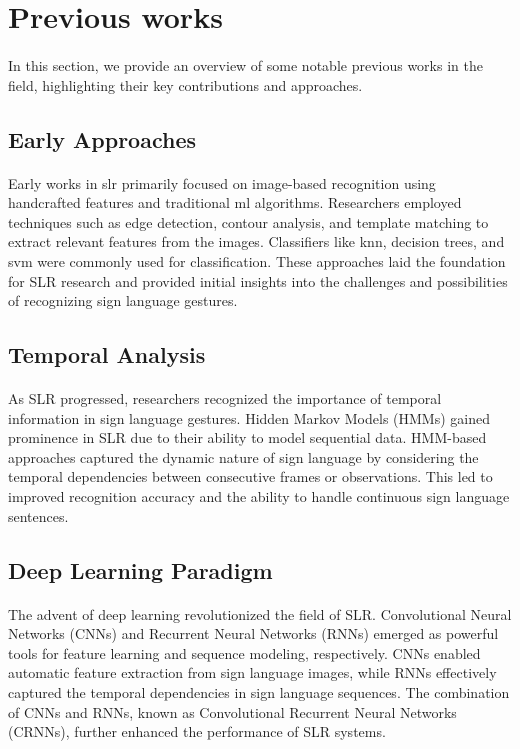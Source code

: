 \section{Previous works}
\paragraph{}
In this section, we provide an overview of some notable previous works in the field, highlighting their key contributions and approaches.

\subsection{Early Approaches}
\paragraph{}
Early works in \ac{slr} primarily focused on image-based recognition using handcrafted features and traditional \ac{ml} algorithms. Researchers employed techniques such as edge detection, contour analysis, and template matching to extract relevant features from the images. Classifiers like \ac{knn}, decision trees, and \ac{svm} were commonly used for classification. These approaches laid the foundation for SLR research and provided initial insights into the challenges and possibilities of recognizing sign language gestures.

\subsection{Temporal Analysis}
\paragraph{}
As SLR progressed, researchers recognized the importance of temporal information in sign language gestures. Hidden Markov Models (HMMs) gained prominence in SLR due to their ability to model sequential data. HMM-based approaches captured the dynamic nature of sign language by considering the temporal dependencies between consecutive frames or observations. This led to improved recognition accuracy and the ability to handle continuous sign language sentences.

\subsection{Deep Learning Paradigm}
\paragraph{}
The advent of deep learning revolutionized the field of SLR. Convolutional Neural Networks (CNNs) and Recurrent Neural Networks (RNNs) emerged as powerful tools for feature learning and sequence modeling, respectively. CNNs enabled automatic feature extraction from sign language images, while RNNs effectively captured the temporal dependencies in sign language sequences. The combination of CNNs and RNNs, known as Convolutional Recurrent Neural Networks (CRNNs), further enhanced the performance of SLR systems.

